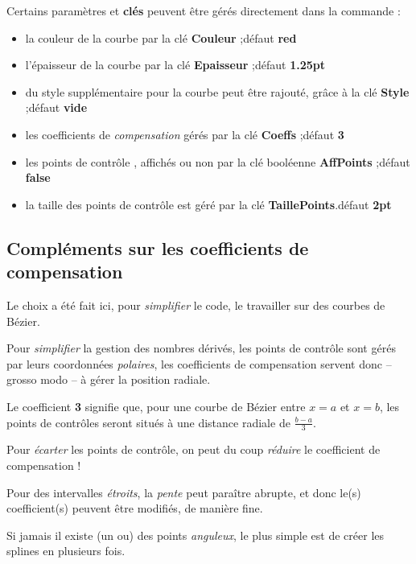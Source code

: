 \documentclass[a4paper,french,11pt]{article}
\newcommand\ctex[1]{\tcbox[vignettelatex]{#1}}
\newcommand\Cle[1]{{\bfseries\sffamily\textlangle \textcolor{orange!75!black}{#1}\textrangle}}
\begin{document}
\begin{cautionblock}
Certains paramètres et \Cle{clés} peuvent être gérés directement dans la commande \ctex{splinetikz} :
%
\begin{itemize}
	\item la couleur de la courbe par la {clé} \Cle{Couleur} ;\hfill{}défaut \Cle{red}
	\item l'épaisseur de la courbe par la {clé} \Cle{Epaisseur} ;\hfill{}défaut \Cle{1.25pt}
	\item du style supplémentaire pour la courbe peut être rajouté, grâce à la {clé} \Cle{Style} ;\hfill{}défaut \Cle{vide}
	\item les coefficients de \textit{compensation} gérés par la {clé} \Cle{Coeffs} ;\hfill{}défaut \Cle{3}
	\item les points de contrôle , affichés ou non par la {clé booléenne} \Cle{AffPoints} ;\hfill{}défaut \Cle{false}
	\item la taille des points de contrôle est géré par la {clé} \Cle{TaillePoints}.\hfill{}défaut \Cle{2pt}
\end{itemize}
\vspace*{-\baselineskip}\leavevmode
\end{cautionblock}

\subsection{Compléments sur les coefficients de \og compensation \fg}

\begin{tipblock}
Le choix a été fait ici, pour \textit{simplifier} le code, le travailler sur des courbes de Bézier.

Pour \textit{simplifier} la gestion des nombres dérivés, les points de contrôle sont gérés par leurs coordonnées \textit{polaires}, les \textsf{coefficients de compensation} servent donc -- grosso modo -- à gérer la position radiale.

\smallskip

Le coefficient \Cle{3} signifie que, pour une courbe de Bézier entre $x=a$ et $x=b$, les points de contrôles seront situés à une distance radiale de $\frac{b-a}{3}$.

Pour \textit{écarter} les points de contrôle, on peut du coup \textit{réduire} le coefficient de compensation !

\medskip

Pour des intervalles \textit{étroits}, la \textit{pente} peut paraître abrupte, et donc le(s) coefficient(s) peuvent être modifiés, de manière fine.

\medskip

Si jamais il existe (un ou) des points \textit{anguleux}, le plus simple est de créer les splines en plusieurs fois.
\end{tipblock}
\end{document}
